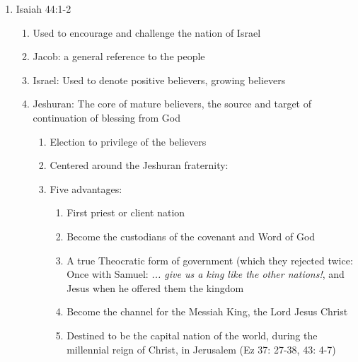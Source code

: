 \documentclass[11pt]{article}
\begin{document}
\begin{enumerate}
\begin{enumerate}
\begin{enumerate}
		\end{enumerate}
	\end{enumerate}
	\item Isaiah 44:1-2
	\begin{enumerate}
		\item Used to encourage and challenge the nation of Israel
		\item Jacob: a general reference to the people
		\item Israel: Used to denote positive believers, growing believers
		\item Jeshuran: The core of mature believers, the source and target of continuation of blessing from God
		\begin{enumerate}
			\item Election to privilege of the believers
			\item Centered around the Jeshuran fraternity:
			\item Five advantages:
			\begin{enumerate}
				\item First priest or client nation
				\item Become the custodians of the covenant and Word of God
				\item A true Theocratic form of government (which they rejected twice: Once with Samuel: \emph{... give us a king like the other nations!}, and Jesus when he offered them the kingdom
				\item Become the channel for the Messiah King, the Lord Jesus Christ
				\item Destined to be the capital nation of the world, during the millennial reign of Christ, in Jerusalem (Ez 37: 27-38, 43: 4-7)
			\end{enumerate}
		\end{enumerate}
	\end{enumerate}
\end{enumerate}
\end{document}
